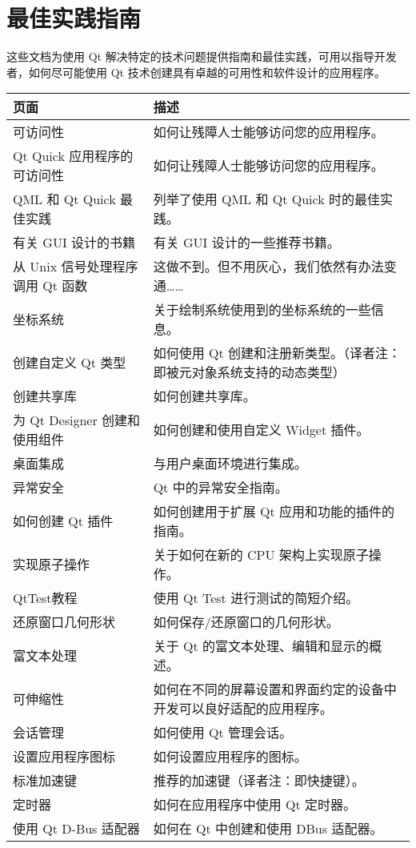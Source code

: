 \chapter{最佳实践指南}

这些文档为使用 Qt 解决特定的技术问题提供指南和最佳实践，可用以指导开发者，如何尽可能使用 Qt 技术创建具有卓越的可用性和软件设计的应用程序。

\begin{longtable}{|l|m{25em}|}
\hline
页面	& 描述 \\ 
\hline
可访问性	& 如何让残障人士能够访问您的应用程序。 \\ 
\hline
Qt Quick 应用程序的可访问性 &	如何让残障人士能够访问您的应用程序。 \\ 
\hline
QML 和 Qt Quick 最佳实践	& 列举了使用 QML 和 Qt Quick 时的最佳实践。 \\ 
\hline
有关 GUI 设计的书籍	& 有关 GUI 设计的一些推荐书籍。 \\ 
\hline
从 Unix 信号处理程序调用 Qt 函数 & 	这做不到。但不用灰心，我们依然有办法变通…… \\ 
\hline
坐标系统	& 关于绘制系统使用到的坐标系统的一些信息。 \\ 
\hline
创建自定义 Qt 类型	& 如何使用 Qt 创建和注册新类型。（译者注：即被元对象系统支持的动态类型） \\ 
\hline
创建共享库	& 如何创建共享库。 \\ 
\hline
为 Qt Designer 创建和使用组件 & 	如何创建和使用自定义 Widget 插件。\\
\hline
桌面集成 &	与用户桌面环境进行集成。\\ 
\hline
异常安全 &	Qt 中的异常安全指南。\\ 
\hline
如何创建 Qt 插件 &	如何创建用于扩展 Qt 应用和功能的插件的指南。\\ 
\hline
实现原子操作	& 关于如何在新的 CPU 架构上实现原子操作。 \\ 
\hline
QtTest教程	& 使用 Qt Test 进行测试的简短介绍。 \\ 
\hline
还原窗口几何形状 &	如何保存/还原窗口的几何形状。\\ 
\hline
富文本处理 &	关于 Qt 的富文本处理、编辑和显示的概述。\\ 
\hline
可伸缩性	& 如何在不同的屏幕设置和界面约定的设备中开发可以良好适配的应用程序。\\ 
\hline
会话管理	& 如何使用 Qt 管理会话。 \\ 
\hline
设置应用程序图标	& 如何设置应用程序的图标。\\ 
\hline
标准加速键	& 推荐的加速键（译者注：即快捷键）。\\ 
\hline
定时器 & 	如何在应用程序中使用 Qt 定时器。\\ 
\hline
使用 Qt D-Bus 适配器 &	如何在 Qt 中创建和使用 DBus 适配器。\\ 
	\hline
\end{longtable}